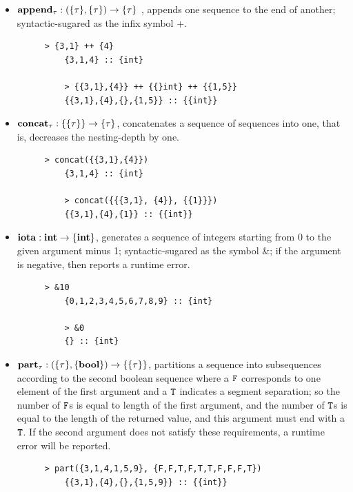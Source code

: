 \begin{itemize}

	\item $\mathbf{append_{\tau} : (\{\tau\}, \{\tau\}) \rightarrow \{\tau\}}$ , 
	appends one sequence to the end of another; syntactic-sugared as the infix symbol {\++}.

	\begin{figure}[H]
	\begin{example}
	\end{example}
	\begin{lstlisting}[style = nesl-style]
	> {3,1} ++ {4}
	{3,1,4} :: {int}
	
	> {{3,1},{4}} ++ {{}int} ++ {{1,5}}
	{{3,1},{4},{},{1,5}} :: {{int}}
	\end{lstlisting}
	\end{figure}


	\item $\mathbf{concat_{\tau}: \{\{\tau\}\} \rightarrow \{\tau\} }$, concatenates a sequence of sequences into one, that is, decreases the nesting-depth by one.
	\begin{figure}[H]
	\begin{example}
	\end{example}
	\begin{lstlisting}[style = nesl-style]
	> concat({{3,1},{4}})
	{3,1,4} :: {int}
	
	> concat({{{3,1}, {4}}, {{1}}})
	{{3,1},{4},{1}} :: {{int}}
	\end{lstlisting}
	\end{figure}

	\item $\mathbf{iota: \mathbf{int} \rightarrow \{\mathbf{int}\}}$, generates a sequence of integers starting from 0 to the given argument minus 1; syntactic-sugared as the symbol \&; if the argument is negative, then reports a runtime error.
	\begin{figure}[H]
	\begin{example}
	\end{example}
	\begin{lstlisting}[style = nesl-style]
	> &10
	{0,1,2,3,4,5,6,7,8,9} :: {int}
	
	> &0
	{} :: {int}
	\end{lstlisting}
	\end{figure}
	
	\item $\mathbf{part_{\tau}: (\{\tau\}, \{\mathbf{bool}\}) \rightarrow  \{\{\tau\}\}}$, partitions a sequence into subsequences according to the second boolean sequence where a $\mathtt{F}$ corresponds to one element of the first argument and a $\mathtt{T}$ indicates a segment separation; so the number of $\mathtt{F}$s is equal to length of the first argument, and the number of $\mathtt{T}$s is equal to the length of the returned value, and this argument must end with a $\mathtt{T}$. 
	If the second argument does not satisfy these requirements, a runtime error will be reported.
	\begin{figure}[H]
	\begin{example}
	\end{example}
	\begin{lstlisting}[style = nesl-style]
	> part({3,1,4,1,5,9}, {F,F,T,F,T,T,F,F,F,T})
	{{3,1},{4},{},{1,5,9}} :: {{int}}
	

\end{lstlisting}
\end{figure}
\end{itemize}
